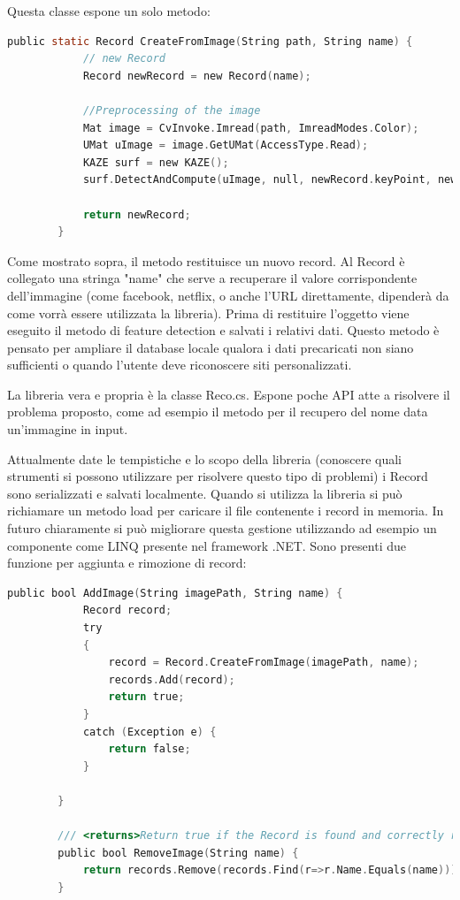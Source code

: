 \documentclass[twoside]{supsistudent}
\begin{document}
Questa classe espone un solo metodo:

\begin{lstlisting}[language=C]
public static Record CreateFromImage(String path, String name) {
            // new Record
            Record newRecord = new Record(name);

            //Preprocessing of the image
            Mat image = CvInvoke.Imread(path, ImreadModes.Color);
            UMat uImage = image.GetUMat(AccessType.Read);
            KAZE surf = new KAZE();
            surf.DetectAndCompute(uImage, null, newRecord.keyPoint, newRecord.descriptors, false);

            return newRecord;
        }
\end{lstlisting}

Come mostrato sopra, il metodo restituisce un nuovo record. Al Record è collegato una stringa "name" che serve a recuperare il valore corrispondente dell'immagine (come facebook, netflix, o anche l'URL direttamente, dipenderà da come vorrà essere utilizzata la libreria). Prima di restituire l'oggetto viene eseguito il metodo di feature detection e salvati i relativi dati. Questo metodo è pensato per ampliare il database locale qualora i dati precaricati non siano sufficienti o quando l'utente deve riconoscere siti personalizzati. 

La libreria vera e propria è la classe Reco.cs. Espone poche API atte a risolvere il problema proposto, come ad esempio il metodo per il recupero del nome data un'immagine in input. 

Attualmente date le tempistiche e lo scopo della libreria (conoscere quali strumenti si possono utilizzare per risolvere questo tipo di problemi) i Record sono serializzati e salvati localmente. Quando si utilizza la libreria si può richiamare un metodo load per caricare il file contenente i record in memoria. In futuro chiaramente si può migliorare questa gestione utilizzando ad esempio un componente come LINQ presente nel framework .NET.
Sono presenti due funzione per aggiunta e rimozione di record:


\begin{lstlisting}[language=C]
public bool AddImage(String imagePath, String name) {
            Record record;
            try
            {
                record = Record.CreateFromImage(imagePath, name);
                records.Add(record);
                return true;
            }
            catch (Exception e) {
                return false;
            }
            
        }
        
        /// <returns>Return true if the Record is found and correctly removed from the repository, else false</returns>
        public bool RemoveImage(String name) {
            return records.Remove(records.Find(r=>r.Name.Equals(name)));
        }
\end{lstlisting}
\end{document}

